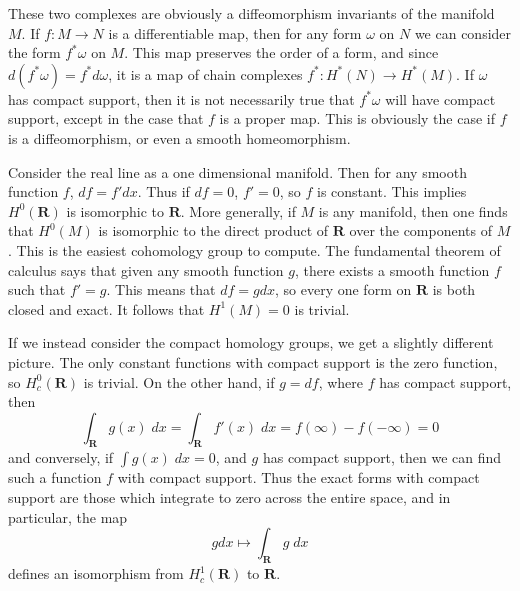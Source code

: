 These two complexes are obviously a diffeomorphism invariants of the manifold $M$. If $f: M \to N$ is a differentiable map, then for any form $\omega$ on $N$ we can consider the form $f^* \omega$ on $M$. This map preserves the order of a form, and since $d(f^* \omega) = f^* d \omega$, it is a map of chain complexes $f^*: H^*(N) \to H^*(M)$. If $\omega$ has compact support, then it is not necessarily true that $f^* \omega$ will have compact support, except in the case that $f$ is a proper map. This is obviously the case if $f$ is a diffeomorphism, or even a smooth homeomorphism.

\begin{example}
    Consider the real line as a one dimensional manifold. Then for any smooth function $f$, $df = f' dx$. Thus if $df = 0$, $f' = 0$, so $f$ is constant. This implies $H^0(\mathbf{R})$ is isomorphic to $\mathbf{R}$. More generally, if $M$ is any manifold, then one finds that $H^0(M)$ is isomorphic to the direct product of $\mathbf{R}$ over the components of $M$. This is the easiest cohomology group to compute. The fundamental theorem of calculus says that given any smooth function $g$, there exists a smooth function $f$ such that $f' = g$. This means that $df = g dx$, so every one form on $\mathbf{R}$ is both closed and exact. It follows that $H^1(M) = 0$ is trivial.
\end{example}

\begin{example}
    If we instead consider the compact homology groups, we get a slightly different picture. The only constant functions with compact support is the zero function, so $H_c^0(\mathbf{R})$ is trivial. On the other hand, if $g = df$, where $f$ has compact support, then
    \[ \int_{\mathbf{R}} g(x)\; dx = \int_{\mathbf{R}} f'(x)\; dx = f(\infty) - f(-\infty) = 0 \]
    and conversely, if $\int g(x)\; dx = 0$, and $g$ has compact support, then we can find such a function $f$ with compact support. Thus the exact forms with compact support are those which integrate to zero across the entire space, and in particular, the map
    \[ g dx \mapsto \int_{\mathbf{R}} g\; dx \]
    defines an isomorphism from $H^1_c(\mathbf{R})$ to $\mathbf{R}$.
\end{example}

